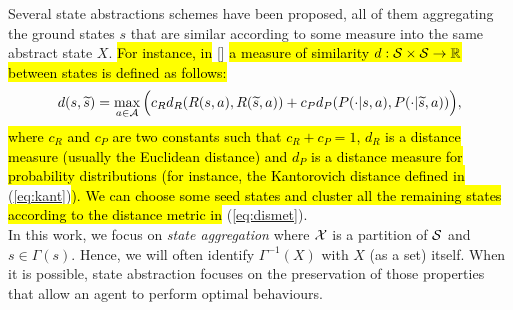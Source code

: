 \newline
Several state abstractions schemes have been proposed, all of them aggregating the ground states $s$ that are similar according to some measure into the same abstract state $X$. \hl{For instance, in} [\cite{ferns2012metrics}] \hl{a measure of similarity $d: \mathcal{S} \times \mathcal{S} \to \mathbb{R}$ between states is defined as follows:}
\begin{align}
d(s, \widetilde{s}) = \max_{a \in \mathcal{A}} \Big( c_{R} d_{R}(R(s,a), R(\widetilde{s}, a)) + c_{P} d_{P}(P(\cdot|s, a), P(\cdot|\widetilde{s}, a)) \Big), \label{eq:dismet}
\end{align}
\hl{where $c_{R}$ and $c_{P}$ are two constants such that $c_{R} + c_{P} = 1$, $d_{R}$ is a distance measure (usually the Euclidean distance) and $d_{P}$ is a distance measure for probability distributions (for instance, the Kantorovich distance defined in} (\ref{eq:kant})\hl{). We can choose some seed states and cluster all the remaining states according to the distance metric in} (\ref{eq:dismet}).\\
\newline 
In this work, we focus on \textit{state aggregation} where $\mathcal{X}$ is a partition of $\mathcal{S}$ and $s\in\Gamma(s)$. Hence, we will often identify $\Gamma^{-1}(X)$ with $X$ (as a set) itself. When it is possible, state abstraction focuses on the preservation of those properties that allow an agent to perform optimal behaviours.
